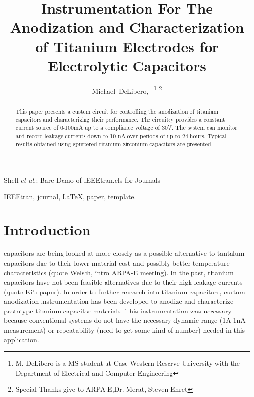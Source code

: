 \documentclass[journal]{IEEEtran}
\begin{document}
\title{Instrumentation For The Anodization and Characterization of Titanium Electrodes for Electrolytic Capacitors}

\author{Michael~DeLibero,~%
\thanks{M. DeLibero is a MS student at Case Western Reserve University with the Department
of Electrical and Computer Engineering}%
\thanks{Special Thanks give to ARPA-E,Dr. Merat, Steven Ehret}}

%
{Shell \MakeLowercase{\textit{et al.}}: Bare Demo of IEEEtran.cls for Journals}

\maketitle

\begin{abstract}
This paper presents a custom circuit for controlling the anodization of titanium capacitors and characterizing their performance. The circuitry provides a constant current source of 0-100mA up to a compliance voltage of 30V. The system can monitor and record leakage currents down to 10 nA over periods of up to 24 hours. Typical results obtained using sputtered titanium-zirconium capacitors are presented.
\end{abstract}

\begin{IEEEkeywords}
IEEEtran, journal, \LaTeX, paper, template.
\end{IEEEkeywords}

\IEEEpeerreviewmaketitle

\section{Introduction}
 capacitors are being looked at more closely as a possible alternative to tantalum capacitors due to their lower material cost and possibly better temperature characteristics (quote Welsch, intro ARPA-E meeting). In the past, titanium capacitors have not been feasible alternatives due to their high leakage currents (quote Ki’s paper). In order to further research into titanium capacitors, custom anodization instrumentation has been developed to anodize and characterize prototype titanium capacitor materials. This instrumentation was necessary because conventional systems do not have the necessary dynamic range (1A-1nA measurement) or repeatability (need to get some kind of number) needed in this application.
\end{document}
